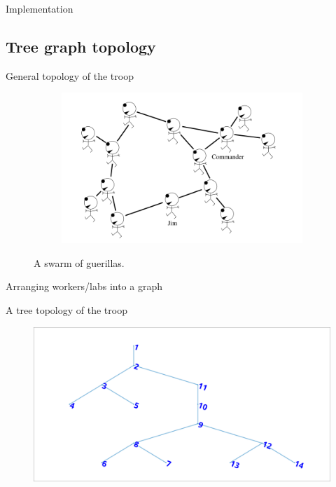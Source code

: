\documentclass[pdflatex,colorlinks,landscape]{beamer}
\begin{document}
\begin{frame}[allowframebreaks]{Implementation}
  \begin{tiny}
    
  \end{tiny}
\end{frame}

\subsection{Tree graph topology}

\begin{frame}{General topology of the troop}
  \begin{figure}[H]
    \begin{figure}
      \includegraphics[width=\textwidth]{SwarmOfGuerillas.png}
    \end{figure}
    \caption{A swarm of guerillas.}
  \end{figure}
\end{frame}

\begin{frame}[allowframebreaks]{Arranging workers/labs into a graph}
  \begin{tiny}
    
  \end{tiny}
\end{frame}  

\begin{frame}{A tree topology of the troop}
  \begin{figure}
    \includegraphics[width=\textwidth]{TroopTopology.png}
  \end{figure}
\end{frame}
\end{document}
